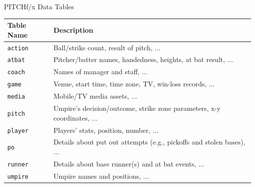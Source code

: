 \documentclass[14pt,ignorenonframetext,aspectratio = 1610]{beamer}
\begin{document}
\begin{frame}{PITCHf/x Data Tables}

\small

\begin{table}[ht]
\centering
\begin{tabular}{ll}
\hline
Table Name & Description \\ 
\hline
{\texttt{action}} & Ball/strike count, result of pitch, ... \\ 
{\texttt{atbat}} & Pitcher/batter names, handedness, heights, at bat result, ... \\ 
{\texttt{coach}} & Names of manager and staff, ... \\ 
{\texttt{game}} & Venue, start time, time zone, TV, win-loss records, ... \\ 
{\texttt{media}} & Mobile/TV media assets, ... \\ 
{\texttt{pitch}} & Umpire's decision/outcome, strike zone parameters, x-y coordinates, ... \\ 
{\texttt{player}} & Players' stats, position, number, ... \\ 
{\texttt{po}} & Details about put out attempts (e.g., pickoffs and stolen bases), ... \\ 
{\texttt{runner}} & Details about base runner(s) and at bat events, ... \\ 
{\texttt{umpire}} & Umpire names and positions, ... \\ 
\hline
\end{tabular}
\end{table}

\end{frame}
\end{document}
